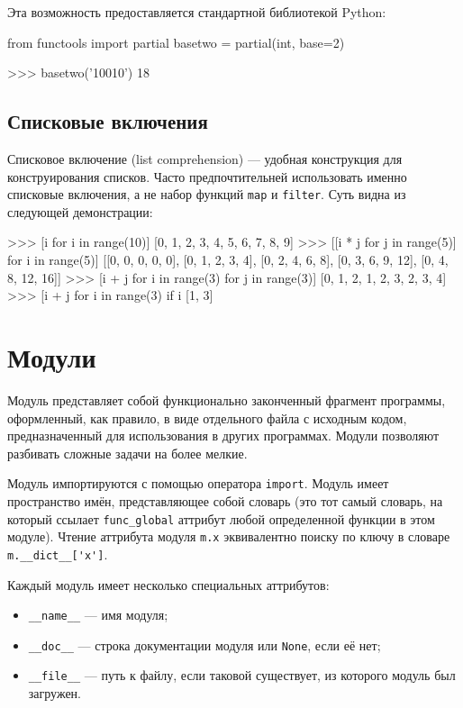Эта возможность предоставляется стандартной библиотекой Python:
\begin{pylst}{}{}
from functools import partial
basetwo = partial(int, base=2)

>>> basetwo('10010')
18
\end{pylst}

\subsection{Списковые включения}
Списковое включение (list comprehension) --- удобная конструкция для конструирования списков. Часто предпочтительней использовать именно списковые включения, а не набор функций \lstinline{map} и \lstinline{filter}. Суть видна из следующей демонстрации:
\begin{pylst}{}{}
>>> [i for i in range(10)]
[0, 1, 2, 3, 4, 5, 6, 7, 8, 9]
>>> [[i * j for j in range(5)] for i in range(5)]
[[0, 0, 0, 0, 0],
 [0, 1, 2, 3, 4],
 [0, 2, 4, 6, 8],
 [0, 3, 6, 9, 12],
 [0, 4, 8, 12, 16]]
>>> [i + j for i in range(3) for j in range(3)]
[0, 1, 2, 1, 2, 3, 2, 3, 4]
>>> [i + j for i in range(3) if i %
[1, 3]
\end{pylst}

\section{Модули}
\label{sec:py-modules}
Модуль представляет собой функционально законченный фрагмент программы, оформленный, как правило, в виде отдельного файла с исходным кодом, предназначенный для использования в других программах. Модули позволяют разбивать сложные задачи на более мелкие.

Модуль импортируются с помощью оператора \lstinline{import}. Модуль имеет пространство имён, представляющее собой словарь (это тот самый словарь, на который ссылает \lstinline{func_global} аттрибут любой определенной функции в этом модуле). Чтение аттрибута модуля \lstinline{m.x} эквивалентно поиску по ключу в словаре \lstinline{m.__dict__['x']}.

Каждый модуль имеет несколько специальных аттрибутов:
\begin{itemize}
  \item \lstinline{__name__} --- имя модуля;
  \item \lstinline{__doc__} --- строка документации модуля или \lstinline{None}, если её нет;
  \item \lstinline{__file__} --- путь к файлу, если таковой существует, из которого модуль был загружен.
\end{itemize}

